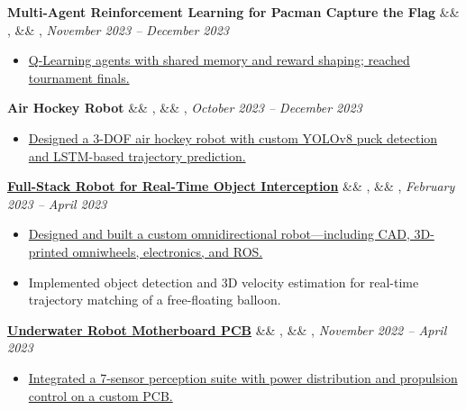 \documentclass[letterpaper,10pt]{article}
\newcommand{\experience}[5]{%
    \vspace{-1mm}%
    \noindent\textbf{#1}%
    \ifx&#2&
    \else
        , \textit{#2}%
    \fi
    \ifx&#3&
    \else
        , #3%
    \fi
    \hfill \textit{#4} \\
    \vspace{-6.8mm}%
    \begin{itemize}[itemsep=-5pt]
        \setlength{\itemindent}{0em}
        #5
    \end{itemize}
}
\begin{document}
\experience
    {Multi-Agent Reinforcement Learning for Pacman Capture the Flag}
    {}
    {}
    {November 2023 – December 2023}
    {
        \item \href{https://github.com/ryan-barry-99/AI_Explorations_Pacman_Capture_the_Flag}{Q-Learning agents with shared memory and reward shaping; reached tournament finals.}
    }


    
\experience
    {Air Hockey Robot}
    {}
    {}
    {October 2023 – December 2023}
    {
        \item \href{https://ryanbarry.me/projects/robotics/air-hockey-robot/}{Designed a 3-DOF air hockey robot with custom YOLOv8 puck detection and LSTM-based trajectory prediction.}
    }


    
\experience
    {\href{https://ryanbarry.me/projects/robotics/omnidirectional-robot/}{Full-Stack Robot for Real-Time Object Interception}}
    {}
    {}
    {February 2023 – April 2023}
    {

        \item \href{https://github.com/ryan-barry-99/Trajectory-Matching-Omnidirectional-Robot/tree/main/}{Designed and built a custom omnidirectional robot—including CAD, 3D-printed omniwheels, electronics, and ROS.}
        \item Implemented object detection and 3D velocity estimation for real-time trajectory matching of a free-floating balloon.
    }
    
\experience
    {\href{https://ryanbarry.me/projects/electrical-engineering/underwater-robot/}{Underwater Robot Motherboard PCB}}
    {}
    {}
    {November 2022 – April 2023}
    {
        \item \href{https://ryanbarry.me/projects/electrical-engineering/underwater-robot/}{Integrated a 7-sensor perception suite with power distribution and propulsion control on a custom PCB.}
        
    }
    
\end{document}
